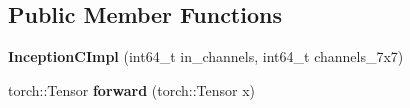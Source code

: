 \subsection*{Public Member Functions}
\begin{DoxyCompactItemize}
\item 
\mbox{\label{structvision_1_1models_1_1__inceptionimpl_1_1InceptionCImpl_a506040572134a1c2e9e4ca6f968c1220}} 
{\bfseries Inception\+C\+Impl} (int64\+\_\+t in\+\_\+channels, int64\+\_\+t channels\+\_\+7x7)
\item 
\mbox{\label{structvision_1_1models_1_1__inceptionimpl_1_1InceptionCImpl_a62a9c639cbd6060687a61ac761852309}} 
torch\+::\+Tensor {\bfseries forward} (torch\+::\+Tensor x)
\end{DoxyCompactItemize}
